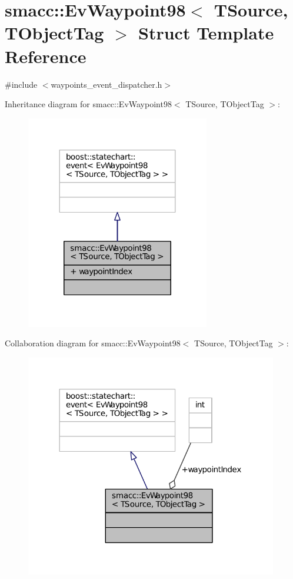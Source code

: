 \hypertarget{structsmacc_1_1EvWaypoint98}{}\section{smacc\+:\+:Ev\+Waypoint98$<$ T\+Source, T\+Object\+Tag $>$ Struct Template Reference}
\label{structsmacc_1_1EvWaypoint98}


{\ttfamily \#include $<$waypoints\+\_\+event\+\_\+dispatcher.\+h$>$}



Inheritance diagram for smacc\+:\+:Ev\+Waypoint98$<$ T\+Source, T\+Object\+Tag $>$\+:
\nopagebreak
\begin{figure}[H]
\begin{center}
\leavevmode
\includegraphics[width=227pt]{structsmacc_1_1EvWaypoint98__inherit__graph}
\end{center}
\end{figure}


Collaboration diagram for smacc\+:\+:Ev\+Waypoint98$<$ T\+Source, T\+Object\+Tag $>$\+:
\nopagebreak
\begin{figure}[H]
\begin{center}
\leavevmode
\includegraphics[width=312pt]{structsmacc_1_1EvWaypoint98__coll__graph}
\end{center}
\end{figure}
